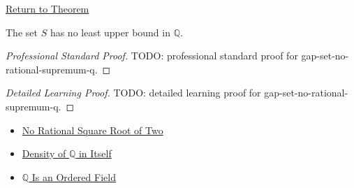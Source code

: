 \newpage
{}
\label{prf:gap-set-no-rational-supremum-q}

\begin{remark*}[Return]
\hyperref[thm:gap-set-no-rational-supremum-q]{Return to Theorem}
\end{remark*}

\begin{theorem*}
The set $S$ has no least upper bound in $\mathbb{Q}$.
\end{theorem*}

\begin{proof}[Professional Standard Proof]
\LRAProofBodyStart
TODO: professional standard proof for gap-set-no-rational-supremum-q.
\end{proof}

\begin{proof}[Detailed Learning Proof]
\LRAProofBodyStart
TODO: detailed learning proof for gap-set-no-rational-supremum-q.
\end{proof}

\begin{remark*}
\end{remark*}

\begin{dependencies}
\begin{itemize}
  \item \hyperref[thm:no-rational-square-root-of-two]{No Rational Square Root of Two}
  \item \hyperref[thm:density-of-q]{Density of $\mathbb{Q}$ in Itself}
  \item \hyperref[thm:q-is-an-ordered-field]{$\mathbb{Q}$ Is an Ordered Field}
\end{itemize}
\end{dependencies}

\clearpage
